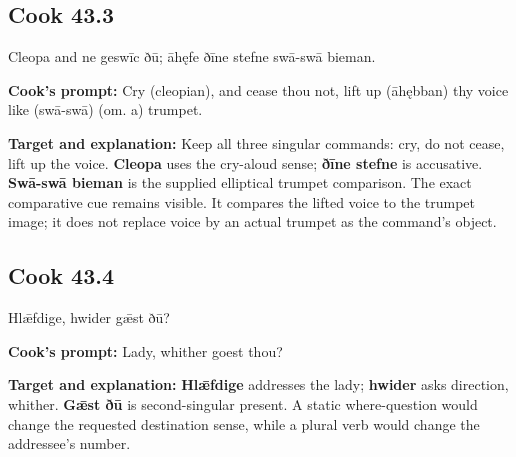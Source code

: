 \par\begin{minipage}{\linewidth}\raggedright
\subsection*{Cook 43.3}

Cleopa and ne geswīc ðū; āhęfe ðīne stefne swā-swā bieman.

\textbf{Cook's prompt:} Cry (cleopian), and cease thou not, lift up (āhębban) thy voice like (swā-swā) (om. a) trumpet.

\textbf{Target and explanation:} Keep all three singular commands: cry, do not cease, lift up the voice. \textbf{Cleopa} uses the cry-aloud sense; \textbf{ðīne stefne} is accusative. \textbf{Swā-swā bieman} is the supplied elliptical trumpet comparison. The exact comparative cue remains visible. It compares the lifted voice to the trumpet image; it does not replace voice by an actual trumpet as the command's object.

\end{minipage}\par\addvspace{4pt}

\par\begin{minipage}{\linewidth}\raggedright
\subsection*{Cook 43.4}

Hlǣfdige, hwider gǣst ðū?

\textbf{Cook's prompt:} Lady, whither goest thou?

\textbf{Target and explanation:} \textbf{Hlǣfdige} addresses the lady; \textbf{hwider} asks direction, whither. \textbf{Gǣst ðū} is second-singular present. A static where-question would change the requested destination sense, while a plural verb would change the addressee's number.

\end{minipage}\par\addvspace{4pt}

